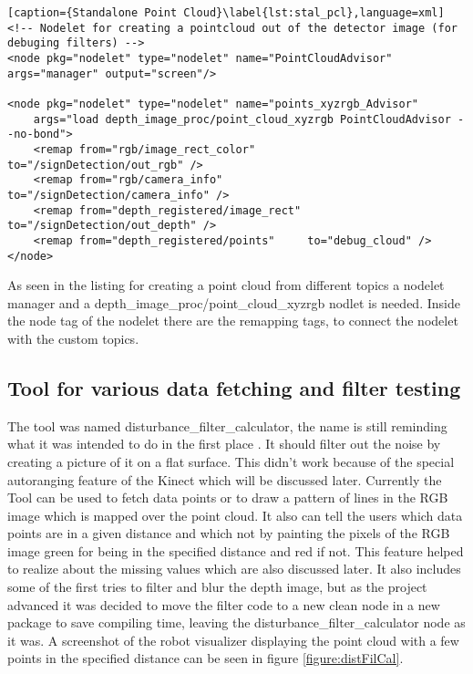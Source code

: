 \begin{lstlisting}[caption={Standalone Point Cloud}\label{lst:stal_pcl},language=xml]
<!-- Nodelet for creating a pointcloud out of the detector image (for debuging filters) -->
<node pkg="nodelet" type="nodelet" name="PointCloudAdvisor" args="manager" output="screen"/>

<node pkg="nodelet" type="nodelet" name="points_xyzrgb_Advisor" 
	args="load depth_image_proc/point_cloud_xyzrgb PointCloudAdvisor --no-bond">
    <remap from="rgb/image_rect_color"        to="/signDetection/out_rgb" />
    <remap from="rgb/camera_info"             to="/signDetection/camera_info" />
    <remap from="depth_registered/image_rect" to="/signDetection/out_depth" />
    <remap from="depth_registered/points"     to="debug_cloud" />
</node>
\end{lstlisting}

As seen in the listing for creating a point cloud from different topics a nodelet manager and a 
depth\_image\_proc/point\_cloud\_xyzrgb nodlet is needed. Inside the node tag of the nodelet
there are the remapping tags, to connect the nodelet with the custom topics.


\subsection{Tool for various data fetching and filter testing}
The tool was named disturbance\_filter\_calculator, the name is still reminding what it was intended to do in the first place
. It should filter out the noise by creating a picture of it on a flat surface. This didn't work because of the special 
autoranging feature of the Kinect which will be discussed later. Currently the Tool can be used to fetch data points or to
draw a pattern of lines in the RGB image which is mapped over the point cloud. It also can tell the users which data points
are in a given distance and which not by painting the pixels of the RGB image green for being in the specified distance
and red if not. This feature helped to realize about the missing values which are also discussed later. It also includes
some of the first tries to filter and blur the depth image, but as the project advanced it was decided to move the 
filter code to a new clean node in a new package to save compiling time, leaving the disturbance\_filter\_calculator 
node as it was. A screenshot of the robot visualizer displaying the point cloud with a few points in the specified distance
can be seen in figure \vref{figure:distFilCal}.

